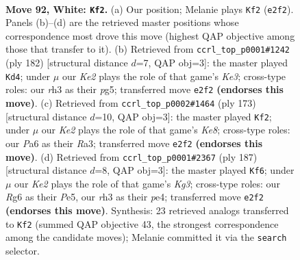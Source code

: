 \documentclass[11pt]{article}
\begin{document}
\clearpage

\begin{figure}[p]\centering
\begin{subfigure}{0.46\textwidth}\centering
\resizebox{\linewidth}{!}{%
\newchessgame
\chessboard[
  setfen={3nk3/8/P5R1/8/8/7r/4K3/8 w - - 11 92},
  showmover=false,
  pgfstyle=straightmove, color=movearrow, markmove={e2-f2}
]}
\caption{}
\end{subfigure}\hfill
\begin{subfigure}{0.46\textwidth}\centering
\resizebox{\linewidth}{!}{%
\newchessgame
\chessboard[
  setfen={8/5k2/5n2/6p1/6P1/4K3/6R1/8 w - - 45 92},
  showmover=false,
  pgfstyle=straightmove, color=movearrow, markmove={e3-d4}
]}
\caption{}
\end{subfigure}
\\[4pt]
\begin{subfigure}{0.46\textwidth}\centering
\resizebox{\linewidth}{!}{%
\newchessgame
\chessboard[
  setfen={6r1/8/8/3N4/4K3/r7/8/4k2R b - - 15 87},
  showmover=false,
  pgfstyle=straightmove, color=movearrow, markmove={e1-f2}
]}
\caption{}
\end{subfigure}\hfill
\begin{subfigure}{0.46\textwidth}\centering
\resizebox{\linewidth}{!}{%
\newchessgame
\chessboard[
  setfen={8/8/6k1/4p3/4P3/r7/4K3/4N3 b - - 43 94},
  showmover=false,
  pgfstyle=straightmove, color=movearrow, markmove={g6-f6}
]}
\caption{}
\end{subfigure}
\caption{\textbf{Move 92, White: \texttt{Kf2}.} (a) Our position; Melanie plays \texttt{Kf2} (\texttt{e2f2}). Panels (b)--(d) are the retrieved master positions whose correspondence most drove this move (highest QAP objective among those that transfer to it). (b) Retrieved from \texttt{ccrl\_top\_p0001\#1242} (ply 182) [structural distance $d$=7, QAP obj=3]: the master played \texttt{Kd4}; under $\mu$ our \emph{Ke2} plays the role of that game's \emph{Ke3}; cross-type roles: our \emph{r}h3 as their \emph{p}g5; transferred move \texttt{e2f2} \textbf{(endorses this move)}. (c) Retrieved from \texttt{ccrl\_top\_p0002\#1464} (ply 173) [structural distance $d$=10, QAP obj=3]: the master played \texttt{Kf2}; under $\mu$ our \emph{Ke2} plays the role of that game's \emph{Ke8}; cross-type roles: our \emph{P}a6 as their \emph{R}a3; transferred move \texttt{e2f2} \textbf{(endorses this move)}. (d) Retrieved from \texttt{ccrl\_top\_p0001\#2367} (ply 187) [structural distance $d$=8, QAP obj=3]: the master played \texttt{Kf6}; under $\mu$ our \emph{Ke2} plays the role of that game's \emph{Kg3}; cross-type roles: our \emph{R}g6 as their \emph{P}e5, our \emph{r}h3 as their \emph{p}e4; transferred move \texttt{e2f2} \textbf{(endorses this move)}. Synthesis: 23 retrieved analogs transferred to \texttt{Kf2} (summed QAP objective 43, the strongest correspondence among the candidate moves); Melanie committed it via the \texttt{search} selector.}
\label{fig:thought-m182}
\end{figure}
\end{document}
